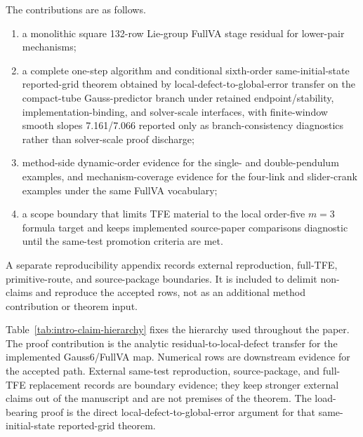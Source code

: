\documentclass[preprint,12pt]{elsarticle}
\newcommand{\method}{Gauss6\slash FullVA}
\newcommand{\tfe}{TFE}
\begin{document}
The contributions are as follows.
\begin{enumerate}
  \item a monolithic square 132-row Lie-group FullVA stage residual for
  lower-pair mechanisms;
  \item a complete one-step algorithm and conditional sixth-order
  same-initial-state reported-grid theorem obtained by
  local-defect-to-global-error transfer on the compact-tube Gauss-predictor branch
  under retained endpoint/stability, implementation-binding, and solver-scale interfaces,
  with finite-window smooth slopes 7.161/7.066 reported only as
  branch-consistency diagnostics rather than solver-scale proof discharge;
  \item method-side dynamic-order evidence for the single- and
  double-pendulum examples, and mechanism-coverage evidence for the four-link
  and slider-crank examples under the same FullVA vocabulary;
  \item a scope boundary that limits \tfe{} material to the local
  order-five \(m=3\) formula target and keeps implemented source-paper
  comparisons diagnostic until the same-test promotion criteria are met.
\end{enumerate}
A separate reproducibility appendix records external reproduction,
full-\tfe{}, primitive-route, and source-package boundaries. It
is included to delimit non-claims and reproduce the accepted rows, not as an
additional method contribution or theorem input.

Table~\ref{tab:intro-claim-hierarchy} fixes the hierarchy used throughout the
paper.  The proof contribution is the analytic residual-to-local-defect
transfer for the implemented \method{} map.  Numerical rows are downstream
evidence for the accepted path.  External same-test reproduction,
source-package, and full-\tfe{} replacement records are boundary evidence;
they keep stronger external claims out of the manuscript and are not premises of
the theorem.
The load-bearing proof is the direct local-defect-to-global-error argument for
that same-initial-state reported-grid theorem.
\end{document}
